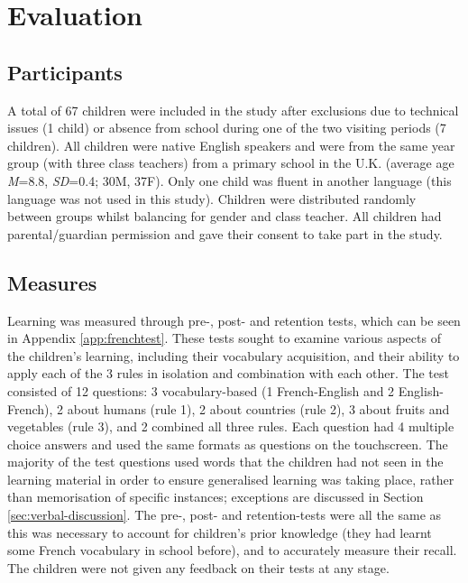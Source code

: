 \section{Evaluation} \label{sec:verbal-eval}
\subsection{Participants}\label{sec:verbal-participants}
A total of 67 children were included in the study after exclusions due to technical issues (1 child) or absence from school during one of the two visiting periods (7 children). All children were native English speakers and were from the same year group (with three class teachers) from a primary school in the U.K. (average age \textit{M}=8.8, \textit{SD}=0.4; 30M, 37F). Only one child was fluent in another language (this language was not used in this study). Children were distributed randomly between groups whilst balancing for gender and class teacher. All children had parental/guardian permission and gave their consent to take part in the study.

\subsection{Measures}\label{sec:verbal-measures}
Learning was measured through pre-, post- and retention tests, which can be seen in Appendix \ref{app:frenchtest}. These tests sought to examine various aspects of the children's learning, including their vocabulary acquisition, and their ability to apply each of the 3 rules in isolation and combination with each other. The test consisted of 12 questions: 3 vocabulary-based (1 French-English and 2 English-French), 2 about humans (rule 1), 2 about countries (rule 2), 3 about fruits and vegetables (rule 3), and 2 combined all three rules. Each question had 4 multiple choice answers and used the same formats as questions on the touchscreen. The majority of the test questions used words that the children had not seen in the learning material in order to ensure generalised \gls{learning} was taking place, rather than memorisation of specific instances; exceptions are discussed in Section \ref{sec:verbal-discussion}. The pre-, post- and retention-tests were all the same as this was necessary to account for children's prior knowledge (they had learnt some French vocabulary in school before), and to accurately measure their recall. The children were not given any feedback on their tests at any stage.

